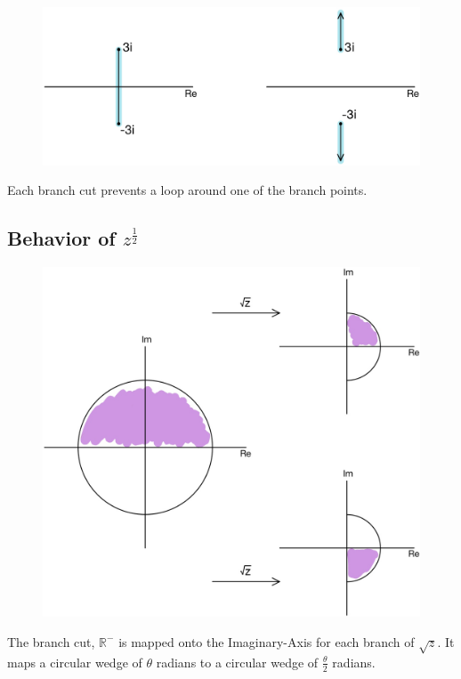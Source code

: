 \documentclass[11pt]{article}
\begin{document}
\begin{figure}[H]
\includegraphics[scale = 0.2]{5_7}
\centering
\end{figure}
Each branch cut prevents a loop around one of the branch points. 
\newpage
\subsection{Behavior of $z^{\frac{1}{2}}$} 
\begin{figure}[H]
\includegraphics[scale = 0.2]{5_8}
\centering
\end{figure}
The branch cut, $\mathbb{R}^{-}$ is mapped onto the Imaginary-Axis for each branch of $\sqrt{z}$. It maps a circular wedge of $\theta$ radians to a circular wedge of $\frac{\theta}{2}$ radians. 

\newpage
\end{document}
